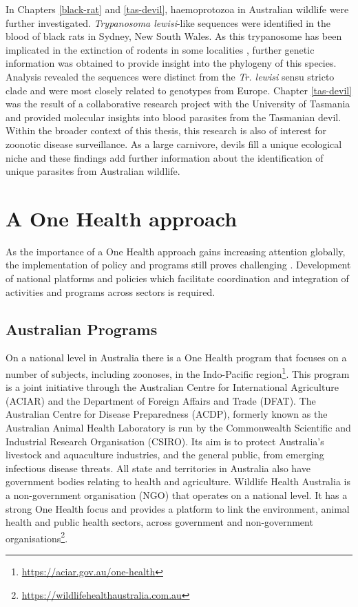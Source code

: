 \documentclass[a4paper, nobind]{templates/ociamthesis}
\begin{document}
In Chapters \ref{black-rat} and \ref{tas-devil}, haemoprotozoa in Australian wildlife were further investigated.
\emph{Trypanosoma lewisi}-like sequences were identified in the blood of black rats in Sydney, New South Wales.
As this trypanosome has been implicated in the extinction of rodents in some localities \autocite{wyattHistoricalMammalExtinction2008}, further genetic information was obtained to provide insight into the phylogeny of this species.
Analysis revealed the sequences were distinct from the \emph{Tr. lewisi} sensu stricto clade and were most closely related to genotypes from Europe.
Chapter \ref{tas-devil} was the result of a collaborative research project with the University of Tasmania and provided molecular insights into blood parasites from the Tasmanian devil.
Within the broader context of this thesis, this research is also of interest for zoonotic disease surveillance.
As a large carnivore, devils fill a unique ecological niche and these findings add further information about the identification of unique parasites from Australian wildlife.

\hypertarget{a-one-health-approach}{%
\section{A One Health approach}\label{a-one-health-approach}}

As the importance of a One Health approach gains increasing attention globally, the implementation of policy and programs still proves challenging \autocite{predictconsortiumImplementingOneHealth2020}.
Development of national platforms and policies which facilitate coordination and integration of activities and programs across sectors is required.

\hypertarget{australian-programs}{%
\subsection{Australian Programs}\label{australian-programs}}

On a national level in Australia there is a One Health program that focuses on a number of subjects, including zoonoses, in the Indo-Pacific region\footnote{\url{https://aciar.gov.au/one-health}}. This program is a joint initiative through the Australian Centre for International Agriculture (ACIAR) and the Department of Foreign Affairs and Trade (DFAT).
The Australian Centre for Disease Preparedness (ACDP), formerly known as the Australian Animal Health Laboratory is run by the Commonwealth Scientific and Industrial Research Organisation (CSIRO). Its aim is to protect Australia's livestock and aquaculture industries, and the general public, from emerging infectious disease threats. All state and territories in Australia also have government bodies relating to health and agriculture.
Wildlife Health Australia is a non-government organisation (NGO) that operates on a national level.
It has a strong One Health focus and provides a platform to link the environment, animal health and public health sectors, across government and non-government organisations\footnote{\url{https://wildlifehealthaustralia.com.au}}.
\end{document}
